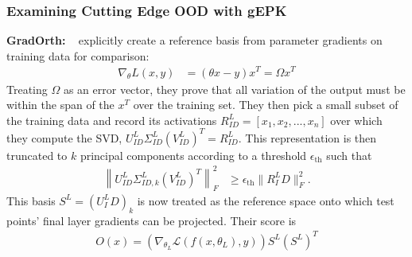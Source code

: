   \begin{frame}
  \frametitle{Examining Cutting Edge OOD with gEPK}
    \textbf{GradOrth: }
    ~\citet{behpour2023} explicitly create a reference basis from parameter gradients on training data for comparison:
\begin{align}
    \nabla_\theta L(x, y) &= (\theta x - y)x^T = \Omega x^T
\end{align}
Treating $\Omega$ as an error vector, they prove that all variation of the output must be within the span of the $x^T$ over the training set. They then pick a small subset of the training data and record its activations $R^L_{ID} = [x_1, x_2, ..., x_n]$ over which they compute the SVD, $U^L_{ID} \Sigma^L_{ID} (V^L_{ID})^T = R^L_{ID}$. This representation is then truncated to $k$ principal components according to a threshold $\epsilon_{\text{th}}$ such that 
\begin{align}
\left\| U^L_{ID} \Sigma^L_{ID, k} (V^L_{ID})^T\right\|^2_F &\geq \epsilon_\text{th} \|R^L_ID\|^2_F.
\end{align}
This basis $S^L = (U^L_ID)_k$ is now treated as the reference space onto which test points' final layer gradients can be projected. Their score is 
\begin{align}
    O(x) = (\nabla_{\theta_L} \mathcal{L}(f(x, \theta_L), y))S^L(S^L)^T
\end{align}
\end{frame}

